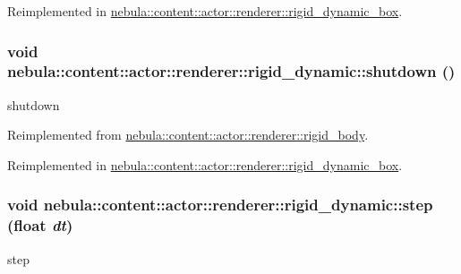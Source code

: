 Reimplemented in \hyperlink{classnebula_1_1content_1_1actor_1_1renderer_1_1rigid__dynamic__box_af1ee2316e0a03674fbbaea64cf1c4a8b}{nebula::content::actor::renderer::rigid\_\-dynamic\_\-box}.\hypertarget{classnebula_1_1content_1_1actor_1_1renderer_1_1rigid__dynamic_a6c0f68639544063b7a7bf404fdbc1370}{
\subsubsection[{shutdown}]{\setlength{\rightskip}{0pt plus 5cm}void nebula::content::actor::renderer::rigid\_\-dynamic::shutdown ()}}
\label{classnebula_1_1content_1_1actor_1_1renderer_1_1rigid__dynamic_a6c0f68639544063b7a7bf404fdbc1370}


shutdown 

Reimplemented from \hyperlink{classnebula_1_1content_1_1actor_1_1renderer_1_1rigid__body_a24b3051c9db06008d8698cc97eff21e0}{nebula::content::actor::renderer::rigid\_\-body}.

Reimplemented in \hyperlink{classnebula_1_1content_1_1actor_1_1renderer_1_1rigid__dynamic__box_a45f52d77d1f89e86d5ac3cd2d0beb4c0}{nebula::content::actor::renderer::rigid\_\-dynamic\_\-box}.\hypertarget{classnebula_1_1content_1_1actor_1_1renderer_1_1rigid__dynamic_a2ba4e3e381092c03c39d21248d635621}{
\subsubsection[{step}]{\setlength{\rightskip}{0pt plus 5cm}void nebula::content::actor::renderer::rigid\_\-dynamic::step (float {\em dt})}}
\label{classnebula_1_1content_1_1actor_1_1renderer_1_1rigid__dynamic_a2ba4e3e381092c03c39d21248d635621}


step 

